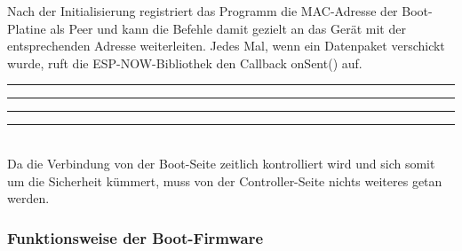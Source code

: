 \documentclass[a4paper,12pt]{article}
\begin{document}
Nach der Initialisierung registriert das Programm die MAC-Adresse der Boot-Platine als Peer und kann die Befehle damit gezielt an das Gerät mit der entsprechenden Adresse weiterleiten. Jedes Mal, wenn ein Datenpaket verschickt wurde, ruft die ESP-NOW-Bibliothek den Callback onSent() auf.
\newline\noindent\rule{\linewidth}{0.4pt}  %

\noindent\rule{\linewidth}{0.4pt}  %
\newpage
\noindent\rule{\linewidth}{0.4pt}  %

\noindent\rule{\linewidth}{0.4pt}\\[0.5em]  %
Da die Verbindung von der Boot-Seite zeitlich kontrolliert wird und sich somit um die Sicherheit kümmert, muss von der Controller-Seite nichts weiteres getan werden.

\subsubsection{Funktionsweise der Boot-Firmware}
\label{sec:Funktionsweise der Boot-Firmware}
\end{document}
